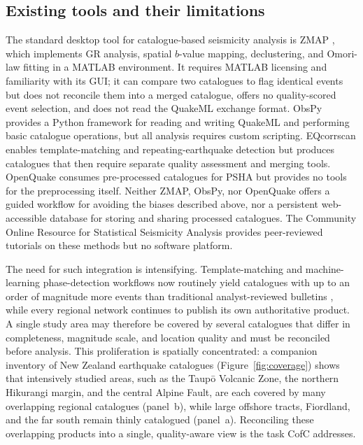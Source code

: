 \documentclass[12pt]{article}
\begin{document}
\subsection{Existing tools and their limitations}
\label{sec:existing}

The standard desktop tool for catalogue-based seismicity analysis is
ZMAP \citep{wiemer2001}, which implements GR analysis, spatial $b$-value
mapping, declustering, and Omori-law fitting in a MATLAB environment.
It requires MATLAB licensing and
familiarity with its GUI; it can compare two catalogues to flag identical
events but does not reconcile them into a merged catalogue, offers no
quality-scored event selection, and does not read the QuakeML exchange format.  ObsPy \citep{obspy2010} provides a Python
framework for reading and writing QuakeML and performing basic catalogue
operations, but all analysis requires custom scripting.  EQcorrscan
\citep{chamberlain2018} enables template-matching and repeating-earthquake
detection but produces catalogues that then require separate quality
assessment and merging tools.  OpenQuake \citep{pagani2014} consumes
pre-processed catalogues for PSHA but provides no tools for the
preprocessing itself.  Neither ZMAP, ObsPy, nor OpenQuake offers a guided
workflow for avoiding the biases described above, nor a persistent
web-accessible database for storing and sharing processed catalogues.
The Community Online Resource for Statistical Seismicity Analysis
\citep[CORSSA;][]{naylor2010,mignan2012,vanstiphout2012,woessner2010}
provides peer-reviewed tutorials on these methods but no software platform.

The need for such integration is intensifying.  Template-matching and
machine-learning phase-detection workflows now routinely yield catalogues with
up to an order of magnitude more events than traditional analyst-reviewed
bulletins \citep{chamberlain2018,mousavi2022,illsley2025,michailos2025,chamberlain2025},
while every regional network continues to publish its own authoritative product.  A single study area may
therefore be covered by several catalogues that differ in completeness,
magnitude scale, and location quality and must be reconciled before analysis.
This proliferation is spatially concentrated: a companion inventory of New
Zealand earthquake catalogues (Figure~\ref{fig:coverage}) shows that
intensively studied areas, such as the Taup\=o Volcanic Zone, the northern
Hikurangi margin, and the central Alpine Fault, are each covered by many
overlapping regional catalogues (panel~b), while large offshore tracts,
Fiordland, and the far south remain thinly catalogued (panel~a).  Reconciling
these overlapping products into a single, quality-aware view is the task CofC
addresses.
\end{document}
